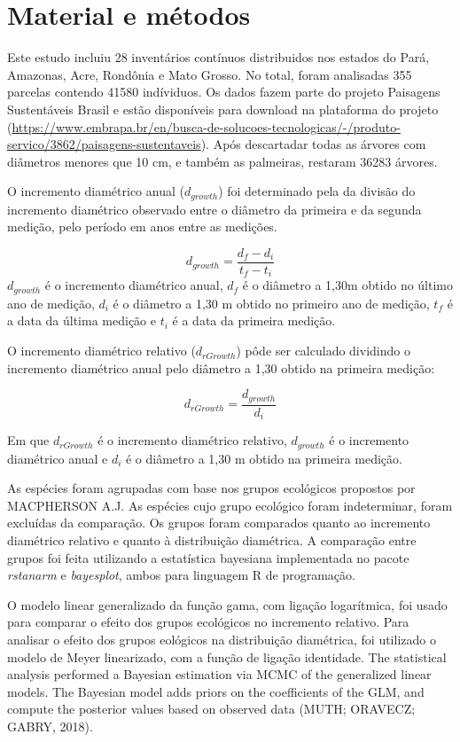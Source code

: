 \documentclass[
]{article}
\begin{document}
\hypertarget{material-e-muxe9todos}{%
\section{Material e métodos}\label{material-e-muxe9todos}}

Este estudo incluiu 28 inventários contínuos distribuidos nos estados do
Pará, Amazonas, Acre, Rondônia e Mato Grosso. No total, foram analisadas
355 parcelas contendo 41580 indíviduos. Os dados fazem parte do projeto
Paisagens Sustentáveis Brasil e estão disponíveis para download na
plataforma do projeto
(\url{https://www.embrapa.br/en/busca-de-solucoes-tecnologicas/-/produto-servico/3862/paisagens-sustentaveis}).
Após descartadar todas as árvores com diâmetros menores que 10 cm, e
também as palmeiras, restaram 36283 árvores.

O incremento diamétrico anual (\(d_{growth}\)) foi determinado pela da
divisão do incremento diamétrico observado entre o diâmetro da primeira
e da segunda medição, pelo período em anos entre as medições.

\[d_{growth} = \frac{d_f - d_i}{t_f - t_i}\] \(d_{growth}\) é o
incremento diamétrico anual, \(d_f\) é o diâmetro a 1,30m obtido no
último ano de medição, \(d_i\) é o diâmetro a 1,30 m obtido no primeiro
ano de medição, \(t_f\) é a data da última medição e \(t_i\) é a data da
primeira medição.

O incremento diamétrico relativo (\(d_{rGrowth}\)) pôde ser calculado
dividindo o incremento diamétrico anual pelo diâmetro a 1,30 obtido na
primeira medição:

\[d_{rGrowth} = \frac{d_{growth}}{d_i}\]

Em que \(d_{rGrowth}\) é o incremento diamétrico relativo,
\(d_{growth}\) é o incremento diamétrico anual e \(d_i\) é o diâmetro a
1,30 m obtido na primeira medição.

As espécies foram agrupadas com base nos grupos ecológicos propostos por
MACPHERSON A.J. As espécies cujo grupo ecológico foram indeterminar,
foram excluídas da comparação. Os grupos foram comparados quanto ao
incremento diamétrico relativo e quanto à distribuição diamétrica. A
comparação entre grupos foi feita utilizando a estatística bayesiana
implementada no pacote \emph{rstanarm} e \emph{bayesplot}, ambos para
linguagem R de programação.

O modelo linear generalizado da função gama, com ligação logarítmica,
foi usado para comparar o efeito dos grupos ecológicos no incremento
relativo. Para analisar o efeito dos grupos eológicos na distribuição
diamétrica, foi utilizado o modelo de Meyer linearizado, com a função de
ligação identidade. The statistical analysis performed a Bayesian
estimation via MCMC of the generalized linear models. The Bayesian model
adds priors on the coefficients of the GLM, and compute the posterior
values based on observed data (MUTH; ORAVECZ; GABRY, 2018).
\end{document}
